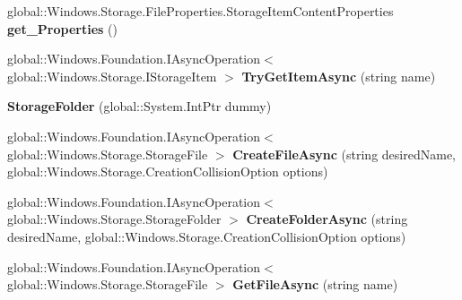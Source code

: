 \begin{DoxyCompactItemize}
\item 
\mbox{\label{class_windows_1_1_storage_1_1_storage_folder_a00d4c92d7a7b2590b3bee76b0de81d34}} 
global\+::\+Windows.\+Storage.\+File\+Properties.\+Storage\+Item\+Content\+Properties {\bfseries get\+\_\+\+Properties} ()
\item 
\mbox{\label{class_windows_1_1_storage_1_1_storage_folder_a1fb213152c9afc34cd979395c35450f9}} 
global\+::\+Windows.\+Foundation.\+I\+Async\+Operation$<$ global\+::\+Windows.\+Storage.\+I\+Storage\+Item $>$ {\bfseries Try\+Get\+Item\+Async} (string name)
\item 
\mbox{\label{class_windows_1_1_storage_1_1_storage_folder_a3088d0d3f00525cc36b786ec7b321398}} 
{\bfseries Storage\+Folder} (global\+::\+System.\+Int\+Ptr dummy)
\item 
\mbox{\label{class_windows_1_1_storage_1_1_storage_folder_a1148f0c45b571856ab96a2bf97e2dd87}} 
global\+::\+Windows.\+Foundation.\+I\+Async\+Operation$<$ global\+::\+Windows.\+Storage.\+Storage\+File $>$ {\bfseries Create\+File\+Async} (string desired\+Name, global\+::\+Windows.\+Storage.\+Creation\+Collision\+Option options)
\item 
\mbox{\label{class_windows_1_1_storage_1_1_storage_folder_ad7abc9e33097dc2a8e60d66d76e5558c}} 
global\+::\+Windows.\+Foundation.\+I\+Async\+Operation$<$ global\+::\+Windows.\+Storage.\+Storage\+Folder $>$ {\bfseries Create\+Folder\+Async} (string desired\+Name, global\+::\+Windows.\+Storage.\+Creation\+Collision\+Option options)
\item 
\mbox{\label{class_windows_1_1_storage_1_1_storage_folder_a3766a445bb3e86f2bf570d83084bb729}} 
global\+::\+Windows.\+Foundation.\+I\+Async\+Operation$<$ global\+::\+Windows.\+Storage.\+Storage\+File $>$ {\bfseries Get\+File\+Async} (string name)
\item 
\mbox{\label{class_windows_1_1_storage_1_1_storage_folder_abb723045c2ef18ea0a93b5788948994c}} 

\end{DoxyCompactItemize}
